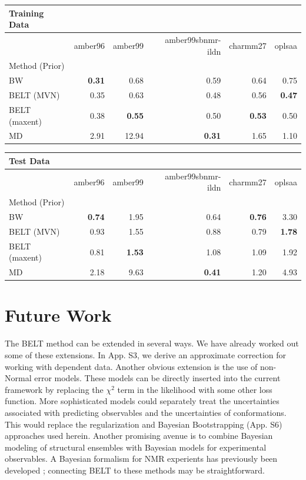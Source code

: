 \documentclass[11pt,titlepage]{article}
\begin{document}
\begin{tabular}{lrrrrr}
Training Data \\
\toprule
   &               amber96 &  amber99 &  amber99sbnmr-ildn &  charmm27 &  oplsaa \\
\midrule
Method (Prior)&          &          &                    &           &         \\
BW            &  \bf{0.31}&     0.68&               0.59 &      0.64 &    0.75 \\
BELT   (MVN)  &     0.35 &     0.63 &               0.48 &      0.56 &\bf{0.47}\\
BELT (maxent) &     0.38 & \bf{0.55}&               0.50 &  \bf{0.53}&    0.50 \\
MD            &     2.91 &    12.94 &           \bf{0.31}&      1.65 &    1.10 \\
\bottomrule
\end{tabular}

\vspace{5mm}

\begin{tabular}{lrrrrr}
Test Data \\
\toprule
   &               amber96 &  amber99 &  amber99sbnmr-ildn &  charmm27 &  oplsaa \\
\midrule
Method (Prior)&          &          &                    &           &         \\
BW            & \bf{0.74}&     1.95 &               0.64 &  \bf{0.76}&    3.30 \\
BELT  (MVN)   &     0.93 &     1.55 &               0.88 &      0.79 &\bf{1.78}\\
BELT  (maxent)&     0.81 & \bf{1.53}&               1.08 &      1.09 &    1.92 \\
MD            &     2.18 &     9.63 &          \bf{0.41} &      1.20 &    4.93 \\
\bottomrule
\end{tabular}

\vspace{5mm}


\section*{Future Work}

The BELT method can be extended in several ways.  We have already worked out some of these extensions.  In App. S3, we derive an approximate correction for working with dependent data.  Another obvious extension is the use of non-Normal error models.  These models can be directly inserted into the current framework by replacing the $\chi^2$ term in the likelihood with some other loss function.  More sophisticated models could separately treat the uncertainties associated with predicting observables and the uncertainties of conformations.  This would replace the regularization and Bayesian Bootstrapping (App. S6) approaches used herein.  Another promising avenue is to combine Bayesian modeling of structural ensembles with Bayesian models for experimental observables.  A Bayesian formalism for NMR experients has previously been developed \citep{rieping2005, habeck2006}; connecting BELT to these methods may be straightforward.  
\end{document}
